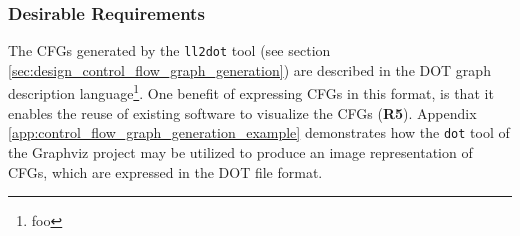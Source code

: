 
\subsubsection{Desirable Requirements}
\label{sec:eval_llvm_ir_library_desirable_requirements}



The CFGs generated by the \texttt{ll2dot} tool (see section \ref{sec:design_control_flow_graph_generation}) are described in the DOT graph description language\footnote{foo}. One benefit of expressing CFGs in this format, is that it enables the reuse of existing software to visualize the CFGs (\textbf{R5}). Appendix \ref{app:control_flow_graph_generation_example} demonstrates how the \texttt{dot} tool of the Graphviz project may be utilized to produce an image representation of CFGs, which are expressed in the DOT file format.
